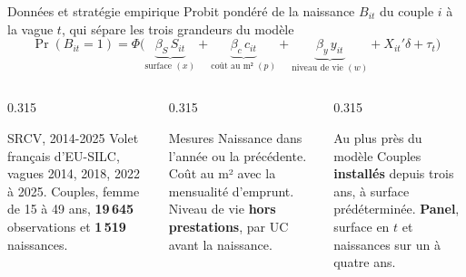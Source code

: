 \documentclass[10pt,aspectratio=169]{beamer}
\begin{document}
\begin{frame}{Données et stratégie empirique}
  \centering\footnotesize
  Probit pondéré de la naissance $B_{it}$ du couple $i$ à la vague $t$, qui sépare les trois grandeurs du modèle
  \[ \Pr(B_{it}=1) = \Phi\big(\underbrace{\beta_S\, S_{it}}_{\text{surface } (x)}
     + \underbrace{\beta_c\, c_{it}}_{\text{coût au m² } (p)}
     + \underbrace{\beta_y\, y_{it}}_{\text{niveau de vie } (w)}
     + X_{it}'\delta + \tau_t\big) \]
  \raggedright
  \begin{columns}[T]
    \begin{column}{0.315\textwidth}
      \begin{callout}[tdtenavy]{SRCV, 2014-2025}
        \footnotesize\RaggedRight Volet français d'EU-SILC, vagues 2014, 2018, 2022 à 2025. Couples, femme de 15 à 49 ans, \textbf{19\,645} observations et \textbf{1\,519} naissances.
      \end{callout}
    \end{column}
    \begin{column}{0.315\textwidth}
      \begin{callout}[tdtenavy]{Mesures}
        \footnotesize\RaggedRight Naissance dans l'année ou la précédente. Coût au m² avec la mensualité d'emprunt. Niveau de vie \textbf{hors prestations}, par UC avant la naissance.
      \end{callout}
    \end{column}
    \begin{column}{0.315\textwidth}
      \begin{callout}{Au plus près du modèle}
        \footnotesize\RaggedRight Couples \textbf{installés} depuis trois ans, à surface prédéterminée. \textbf{Panel}, surface en $t$ et naissances sur un à quatre ans.
      \end{callout}
    \end{column}
  \end{columns}
\end{frame}
\end{document}
